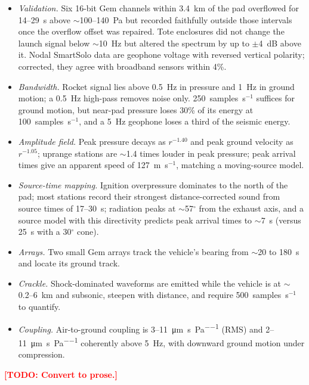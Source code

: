 \documentclass[]{seismica}
\newcommand{\todo}[1]{\textcolor{red}{\textbf{[TODO: #1]}}}
\begin{document}
\begin{itemize}
  \item \textit{Validation.} Six 16-bit Gem channels within 3.4~km of
    the pad overflowed for 14--29~s above $\sim$100--140~Pa but recorded
    faithfully outside those intervals once the overflow offset was
    repaired. Tote enclosures did not change the launch signal below
    $\sim$10~Hz but altered the spectrum by up to $\pm$4~dB above it. Nodal
    SmartSolo data are geophone voltage with reversed vertical
    polarity; corrected, they agree with broadband sensors within 4\%.
  \item \textit{Bandwidth.} Rocket signal lies above 0.5~Hz in pressure
    and 1~Hz in ground motion; a 0.5~Hz high-pass removes noise only.
    250~samples~s$^{-1}$ suffices for ground motion, but near-pad
    pressure loses 30\% of its energy at 100~samples~s$^{-1}$, and a
    5~Hz geophone loses a third of the seismic energy.
  \item \textit{Amplitude field.} Peak pressure decays as $r^{-1.40}$
    and peak ground velocity as $r^{-1.05}$; uprange stations are
    $\sim$1.4 times louder in peak pressure; peak arrival times give an
    apparent speed of 127~m~s$^{-1}$, matching a moving-source model.
  \item \textit{Source-time mapping.} Ignition overpressure dominates to
    the north of the pad; most stations record their strongest
    distance-corrected sound from source times of 17--30~s; radiation
    peaks at $\sim$57$^{\circ}$ from the exhaust axis, and a source
    model with this directivity predicts peak arrival times to $\sim$7~s
    (versus 25~s with a 30$^{\circ}$ cone).
  \item \textit{Arrays.} Two small Gem arrays track the vehicle's
    bearing from $\sim$20 to 180~s and locate its ground track.
  \item \textit{Crackle.} Shock-dominated waveforms are emitted while
    the vehicle is at $\sim$0.2--6~km and subsonic, steepen with
    distance, and require 500~samples~s$^{-1}$ to quantify.
  \item \textit{Coupling.} Air-to-ground coupling is
    3--11~\si{\micro\metre\per\second\per\pascal} (RMS) and
    2--11~\si{\micro\metre\per\second\per\pascal} coherently above
    5~Hz, with downward ground motion under compression.
\end{itemize}
\todo{Convert to prose.}


\end{document}

